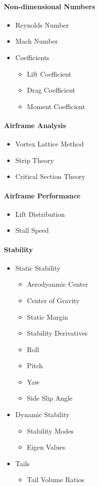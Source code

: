 \documentclass[11pt,twocolumn]{article}
\begin{document}
\paragraph{Non-dimensional Numbers}
\begin{itemize}
	\item Reynolds Number
	\item Mach Number
	\item Coefficients
	\begin{itemize}
		\item Lift Coefficient
		\item Drag Coefficient
		\item Moment Coefficient
	\end{itemize}
\end{itemize}

\paragraph{Airframe Analysis}
\begin{itemize}
	\item Vortex Lattice Method
	\item Strip Theory
	\item Critical Section Theory
\end{itemize}
	
\paragraph{Airframe Performance}
\begin{itemize}
	\item Lift Distribution
	\item Stall Speed
\end{itemize}

\paragraph{Stability}
\begin{itemize}
	\item Static Stability
	\begin{itemize}
		\item Aerodyanmic Center
		\item Center of Gravity
		\item Static Margin
		\item Stability Derivatives
		\item Roll
		\item Pitch
		\item Yaw
		\item Side Slip Angle
	\end{itemize}
	\item Dynamic Stability
	\begin{itemize}
		\item Stability Modes
		\item Eigen Values
	\end{itemize}
	\item Tails
	\begin{itemize}
		\item Tail Volume Ratios
	\end{itemize}
\end{itemize}
\end{document}
